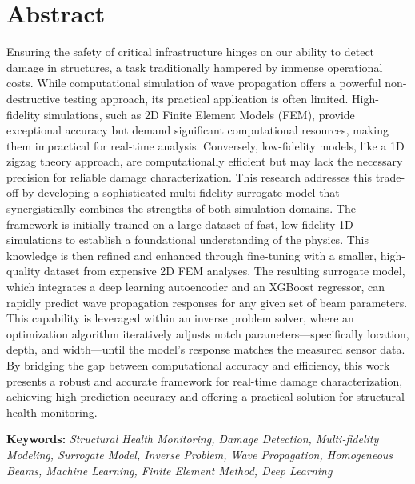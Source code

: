 \documentclass[12pt,a4paper]{report}
\begin{document}
\chapter*{Abstract}
Ensuring the safety of critical infrastructure hinges on our ability to detect damage in structures, a task traditionally hampered by immense operational costs. While computational simulation of wave propagation offers a powerful non-destructive testing approach, its practical application is often limited. High-fidelity simulations, such as 2D Finite Element Models (FEM), provide exceptional accuracy but demand significant computational resources, making them impractical for real-time analysis. Conversely, low-fidelity models, like a 1D zigzag theory approach, are computationally efficient but may lack the necessary precision for reliable damage characterization. This research addresses this trade-off by developing a sophisticated multi-fidelity surrogate model that synergistically combines the strengths of both simulation domains. The framework is initially trained on a large dataset of fast, low-fidelity 1D simulations to establish a foundational understanding of the physics. This knowledge is then refined and enhanced through fine-tuning with a smaller, high-quality dataset from expensive 2D FEM analyses. The resulting surrogate model, which integrates a deep learning autoencoder and an XGBoost regressor, can rapidly predict wave propagation responses for any given set of beam parameters. This capability is leveraged within an inverse problem solver, where an optimization algorithm iteratively adjusts notch parameters—specifically location, depth, and width—until the model's response matches the measured sensor data. By bridging the gap between computational accuracy and efficiency, this work presents a robust and accurate framework for real-time damage characterization, achieving high prediction accuracy and offering a practical solution for structural health monitoring.

\bigskip

\bigskip

\bigskip

\bigskip

\textbf{Keywords:} \textit{Structural Health Monitoring, Damage Detection, Multi-fidelity Modeling, Surrogate Model, Inverse Problem, Wave Propagation, Homogeneous Beams, Machine Learning, Finite Element Method, Deep Learning}

\newpage
{}


\tableofcontents
\newpage
\end{document}
